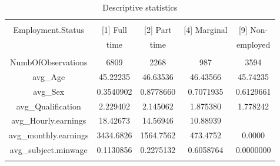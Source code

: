 \documentclass[a4paper]{article}
\begin{document}
\begin{table}[!htbp] \centering 
  \caption{Descriptive statistics} 
  \label{table:tablestardistrikpti} 
\begin{tabular}{@{\extracolsep{1pt}} ccccc} 
\\[-1.8ex]\hline 
\hline \\[-1.8ex] 
Employment.Status & [1] Full & [2] Part  & [4] Marginal & [9] Non- \\ 
& time & time &  & employed\\
\\
NumbOfObservations & 6809 & 2268 &  987 & 3594 \\ 
avg\_Age & 45.22235 & 46.63536 & 46.43566 & 45.74235 \\ 
avg\_Sex & 0.3540902 & 0.8778660 & 0.7071935 & 0.6129661 \\ 
avg\_Qualification & 2.229402 & 2.145062 & 1.875380 & 1.778242 \\ 
avg\_Hourly.earnings & 18.42673 & 14.56946 & 10.88939 &  \\ 
avg\_monthly.earnings & 3434.6826 & 1564.7562 &  473.4752 &    0.0000 \\ 
avg\_subject.minwage & 0.1130856 & 0.2275132 & 0.6058764 & 0.0000000 \\ 
\hline \\[-1.8ex] 
\end{tabular} 
\end{table}  
\end{document}
